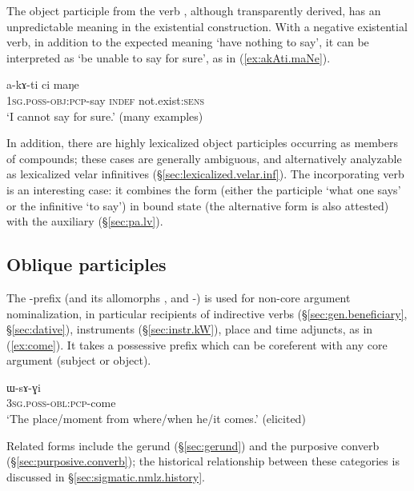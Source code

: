 The object participle  from the verb , although transparently derived, has an unpredictable meaning in the existential construction. With a negative existential verb, in addition to the expected meaning `have nothing to say', it can be interpreted as `be unable to say for sure', as in (\ref{ex:akAti.maNe}).
\largerpage
  \begin{exe}
\ex \label{ex:akAti.maNe}
\gll    a-kɤ-ti ci maŋe \\
 \textsc{1sg}.\textsc{poss}-\textsc{obj}:\textsc{pcp}-say \textsc{indef} not.exist:\textsc{sens} \\
 \glt `I cannot say for sure.' (many examples)
  \end{exe}
  
 
In addition, there are highly lexicalized object participles occurring as members of compounds; these cases are generally ambiguous, and alternatively analyzable as  lexicalized velar infinitives (§\ref{sec:lexicalized.velar.inf}). The incorporating verb  is an interesting case: it combines the form  (either the participle `what one says' or the infinitive `to say') in bound state  (the alternative form  is also attested) with the auxiliary  (§\ref{sec:pa.lv}).
 
\subsection{Oblique participles} \label{sec:oblique.participle}
The -prefix (and its allomorphs ,  and -) is used for non-core argument nominalization, in particular recipients of indirective verbs (§\ref{sec:gen.beneficiary}, §\ref{sec:dative}), instruments (§\ref{sec:instr.kW}), place and time adjuncts, as in (\ref{ex:come}). It takes a possessive prefix which can be coreferent with any core argument (subject or object).

\begin{exe}
\ex \label{ex:come}
\gll ɯ-sɤ-ɣi \\
 \textsc{3sg}.\textsc{poss}-\textsc{obl}:\textsc{pcp}-come \\
\glt  `The place/moment from where/when he/it comes.' (elicited)
\end{exe}

Related forms include the gerund (§\ref{sec:gerund}) and the purposive converb (§\ref{sec:purposive.converb}); the historical relationship between these categories is discussed in §\ref{sec:sigmatic.nmlz.history}.
 
